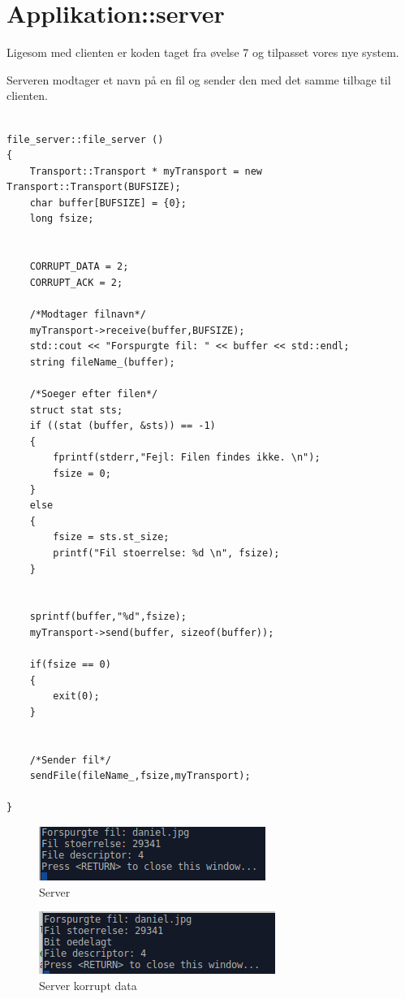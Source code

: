 \graphicspath{{Chapters/Vippefunktionalitet/}}

\chapter{Applikation::server}
Ligesom med clienten er koden taget fra øvelse 7 og tilpasset vores nye system. 

Serveren modtager et navn på en fil og sender den med det samme tilbage til clienten. 

\begin{lstlisting}[frame=single]  % Start your code-block

file_server::file_server ()
{
    Transport::Transport * myTransport = new Transport::Transport(BUFSIZE);
    char buffer[BUFSIZE] = {0};
    long fsize;


    CORRUPT_DATA = 2;
    CORRUPT_ACK = 2;

    /*Modtager filnavn*/
    myTransport->receive(buffer,BUFSIZE);
    std::cout << "Forspurgte fil: " << buffer << std::endl;
    string fileName_(buffer);

    /*Soeger efter filen*/
    struct stat sts;
    if ((stat (buffer, &sts)) == -1)
    {
        fprintf(stderr,"Fejl: Filen findes ikke. \n");
        fsize = 0;
    }
    else
    {
        fsize = sts.st_size;
        printf("Fil stoerrelse: %d \n", fsize);
    }

  
    sprintf(buffer,"%d",fsize);
    myTransport->send(buffer, sizeof(buffer));

    if(fsize == 0)
    {
        exit(0);
    }


    /*Sender fil*/
    sendFile(fileName_,fsize,myTransport);

}
\end{lstlisting}


\begin{figure}[H]
\centering
\includegraphics[width = 300 pt]{Img/server.PNG}
\caption{Server}
\label{fig:konceptbillede}
\end{figure}

\begin{figure}[H]
\centering
\includegraphics[width = 300 pt]{Img/korrupt_data.PNG}
\caption{Server korrupt data}
\label{fig:konceptbillede}
\end{figure}

